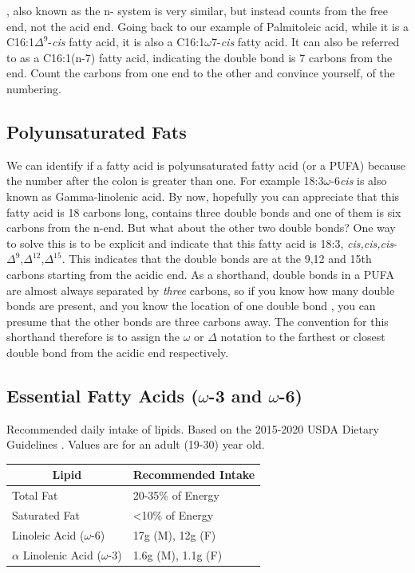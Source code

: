 \documentclass{tufte-handout}
\begin{document}
, also known as the n- system is very similar, but instead counts from the free end, not the acid end.  Going back to our example of Palmitoleic acid, while it is a C16:1$\Delta^9$-\textit{cis} fatty acid, it is also a C16:1$\omega$7-\textit{cis} fatty acid.  It can also be referred to as a C16:1(n-7) fatty acid, indicating the double bond is 7 carbons from the end.  Count the carbons from one end to the other and convince yourself, of the numbering.

\subsection{Polyunsaturated Fats}

We can identify if a fatty acid is polyunsaturated fatty acid (or a PUFA) because the number after the colon is greater than one.  For example 18:3$\omega$-6\textit{cis} is also known as Gamma-linolenic acid.  By now, hopefully you can appreciate that this fatty acid is 18 carbons long, contains three double bonds and one of them is six carbons from the n-end.  But what about the other two double bonds?  One way to solve this is to be explicit and indicate that this fatty acid is 18:3, \textit{cis,cis,cis}-$\Delta^9$,$\Delta^{12}$,$\Delta^{15}$.  This indicates that the double bonds are at the 9,12 and 15th carbons starting from the acidic end.  As a shorthand, double bonds in a PUFA are almost always separated by \emph{three} carbons, so if you know how many double bonds are present, and you know the location of one double bond , you can presume that the other bonds are three carbons away.  The convention for this shorthand therefore is to assign the $\omega$ or $\Delta$ notation to the farthest or closest double bond from the acidic end respectively.

\subsection{Essential Fatty Acids ($\omega$-3  and $\omega$-6)}

\begin{margintable}
\centering
\caption{Recommended daily intake of lipids.  Based on the 2015-2020 USDA Dietary Guidelines \citep{USDA2015}.  Values are for an adult (19-30) year old.}
\label{tab:lipid-amdr}
\begin{tabular}{ll}
\hline
\multicolumn{1}{c}{\textbf{Lipid}} & \textbf{Recommended Intake} \\ \hline
Total Fat &  20-35\% of Energy\\
Saturated Fat & <10\% of Energy\\
Linoleic Acid ($\omega$-6) & 17g (M), 12g (F) \\
$\alpha$ Linolenic Acid ($\omega$-3) & 1.6g (M), 1.1g (F) \\
\end{tabular}
\end{margintable}
\end{document}
